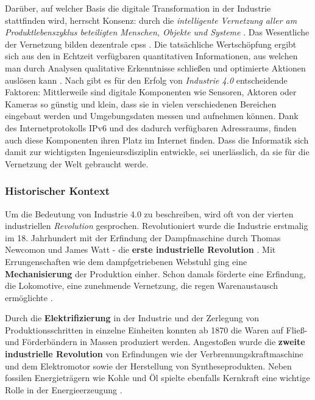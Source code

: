 Darüber, auf welcher Basis die digitale Transformation in der Industrie stattfinden wird, herrscht Konsenz: durch die \textit{intelligente Vernetzung aller am Produktlebenszyklus beteiligten Menschen, Objekte und Systeme} \citep{Roth2016}. Das Wesentliche der Vernetzung bilden dezentrale \acf{cpss} \citep{Bendel2019a}. Die tatsächliche Wertschöpfung ergibt sich aus den in Echtzeit verfügbaren quantitativen Informationen, aus welchen man durch Analysen qualitative Erkenntnisse schließen und optimierte Aktionen auslösen kann \citep{Hnisch2017}. Nach \cite{Sendler2016} gibt es für den Erfolg von \textit{Industrie 4.0} entscheidende Faktoren: Mittlerweile sind digitale Komponenten wie Sensoren, Aktoren oder Kameras so günstig und klein, dass sie in vielen verschiedenen Bereichen eingebaut werden und Umgebungsdaten messen und aufnehmen können. Dank des Internetprotokolls IPv6 und des dadurch verfügbaren Adressraums, finden auch diese Komponenten ihren Platz im Internet finden. Dass die Informatik sich damit zur wichtigsten Ingenieursdisziplin entwickle, sei unerlässlich, da sie für die Vernetzung der Welt gebraucht werde.

\subsubsection{Historischer Kontext}

Um die Bedeutung von Industrie 4.0 zu beschreiben, wird oft von der vierten industriellen \textit{Revolution} gesprochen. Revolutioniert wurde die Industrie erstmalig im 18. Jahrhundert mit der Erfindung der Dampfmaschine durch Thomas Newcomon und James Watt - die \textbf{erste industrielle Revolution} \citep{Roth2016}. Mit Errungenschaften wie dem dampfgetriebenen Webstuhl ging eine \textbf{Mechanisierung }der Produktion einher. Schon damals förderte eine Erfindung, die Lokomotive, eine zunehmende Vernetzung, die regen Warenaustausch ermöglichte \citep{Barthelmaes2017}.

Durch die \textbf{Elektrifizierung} in der Industrie und der Zerlegung von Produktionsschritten in einzelne Einheiten konnten ab 1870 die Waren auf Fließ- und Förderbändern in Massen produziert werden. Angestoßen wurde die \textbf{zweite industrielle Revolution} von Erfindungen wie der Verbrennungskraftmaschine und dem Elektromotor sowie der Herstellung von Syntheseprodukten. Neben fossilen Energieträgern wie Kohle und Öl spielte ebenfalls Kernkraft eine wichtige Rolle in der Energieerzeugung \citep{Barthelmaes2017}.


